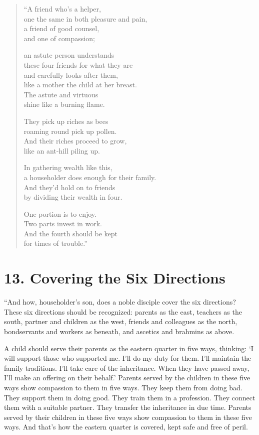 \documentclass[12pt,openany]{book}%
\begin{document}
\begin{verse}%
“A friend who’s a helper, \\
one the same in both pleasure and pain, \\
a friend of good counsel, \\
and one of compassion; 

an astute person understands \\
these four friends for what they are \\
and carefully looks after them, \\
like a mother the child at her breast. \\
The astute and virtuous \\
shine like a burning flame. 

They pick up riches as bees \\
roaming round pick up pollen. \\
And their riches proceed to grow, \\
like an ant-hill piling up. 

In gathering wealth like this, \\
a householder does enough for their family. \\
And they’d hold on to friends \\
by dividing their wealth in four. 

One portion is to enjoy. \\
Two parts invest in work. \\
And the fourth should be kept \\
for times of trouble.” 

%
\end{verse}

\section*{13. Covering the Six Directions }

“And how, householder’s son, does a noble disciple cover the six directions? These six directions should be recognized: parents as the east, teachers as the south, partner and children as the west, friends and colleagues as the north, bondservants and workers as beneath, and ascetics and brahmins as above. 

A child should serve their parents as the eastern quarter in five ways, thinking: ‘I will support those who supported me. I’ll do my duty for them. I’ll maintain the family traditions. I’ll take care of the inheritance. When they have passed away, I’ll make an offering on their behalf.’ Parents served by the children in these five ways show compassion to them in five ways. They keep them from doing bad. They support them in doing good. They train them in a profession. They connect them with a suitable partner. They transfer the inheritance in due time. Parents served by their children in these five ways show compassion to them in these five ways. And that’s how the eastern quarter is covered, kept safe and free of peril. 
\end{document}
